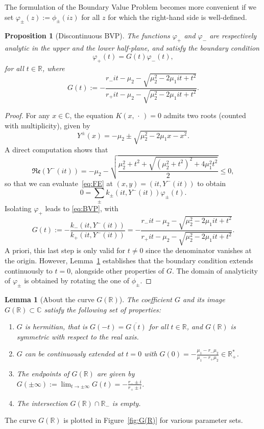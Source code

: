 \documentclass{article}
\theoremstyle{plain}
\newtheorem{proposition}[theorem]{Proposition}
\newtheorem{lemma}[theorem]{Lemma}
\theoremstyle{definition}
\theoremstyle{remark}
\begin{document}
The formulation of the Boundary Value Problem becomes more convenient if we set $\varphi_\pm(z):=\phi_\pm(iz)$ for all $z$ for which the right-hand side is well-defined.

\begin{proposition}[Discontinuous BVP]\label{prop:bvp_disc} The functions $\varphi_+$ and $\varphi_-$ are respectively analytic in the upper and the lower half-plane, and satisfy the boundary condition
    \begin{equation}\label{eq:BVP}
    \varphi_+(t)=G(t)\varphi_-(t),
    \end{equation}
    for all $t\in\mathbb R$, where 
    \begin{equation}\label{eq:G}
        G(t):=-\frac{r_- it-\mu_2- \sqrt{\mu_2^2-2\mu_1it+t^2}}{r_+it-\mu_2- \sqrt{\mu_2^2-2\mu_1it+t^2}}.
    \end{equation}
\end{proposition}

\begin{proof} For any $x\in \mathbb C$, the equation $K(x,\,\cdot\,)=0$ admits two roots (counted with multiplicity), given by 
$$Y^\pm(x)=-\mu_2\pm \sqrt{\mu_2^2-2\mu_1x-x^2}.$$
A direct computation shows that
$$\mathfrak{Re}\left(Y^-(it)\right) = -\mu_2 - \sqrt{\frac{\mu_2^2 + t^2 + \sqrt{(\mu_2^2 + t^2)^2 + 4\mu_1^2 t^2}}{2}}\leqslant 0,$$
so that we can evaluate~\eqref{eq:FE} at $(x,y)=(it,Y^-(it))$ to obtain
$$0=\sum_\pm k_\pm(it,Y^-(it))\varphi_\pm(t).$$
Isolating $\varphi_+$ leads to \eqref{eq:BVP}, with
$$G(t):=-\frac{k_-(it,Y^-(it))}{k_+(it,Y^-(it))}=-\frac{r_-it-\mu_2-\sqrt{\mu_2^2-2\mu_1 it +t^2}}{r_+it-\mu_2-\sqrt{\mu_2^2-2\mu_1 it +t^2}}.$$
A priori, this last step is only valid for $t\ne 0$ since the denominator vanishes at the origin. However, Lemma~\ref{lemma:G(R)} establishes that the boundary condition extends continuously to $t=0$, alongside other properties of $G$. The domain of analyticity of $\varphi_\pm$ is obtained by rotating the one of $\phi_\pm$.
\end{proof}
\begin{lemma}[About the curve $G(\mathbb R)$] \label{lemma:G(R)}The coefficient $G$ and its image $G(\mathbb R)\subset\mathbb C$ satisfy the following set of properties:
    \begin{enumerate}
    \item $G$ is \textit{hermitian}, that is $G(-t)=\overline{G(t)}$ for all $t\in\mathbb R$, and $G(\mathbb R)$ is symmetric with respect to the real axis.
    \item $G$ can be continuously extended at $t=0$ with $G(0)=-\displaystyle\frac{\mu_1-r_-\mu_2}{\mu_1-r_+\mu_2}\in\mathbb R_{+}^*$.
        \item The endpoints of $G(\mathbb R)$ are given by $G(\pm \infty):=\lim_{t\to\pm\infty}G(t)=\displaystyle -\frac{r_-\pm i}{r_+\pm i}$.
        \item The intersection $G(\mathbb R)\cap \mathbb R_{-}$ is empty.
    \end{enumerate}
\end{lemma}
\noindent The curve $G(\mathbb R)$ is plotted in Figure~\ref{fig:G(R)} for various parameter sets. 
\end{document}
